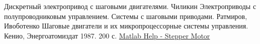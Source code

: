 \newpage
\begin{thebibliography}{20}
 Дискретный электропривод с шаговыми двигателями. Чиликин
 Электроприводы с полупроводниковым управлением. Системы с шаговыми приводами. Ратмиров, Ивоботенко
 Шаговые двигатели и их микропроцессорные системы управления. Кенио, Энергоатомиздат 1987. 200 с.
 \href{http://www.mathworks.com/help/physmod/sps/powersys/ref/steppermotor.html}{Matlab Help - Stepper Motor}
\end{thebibliography}
